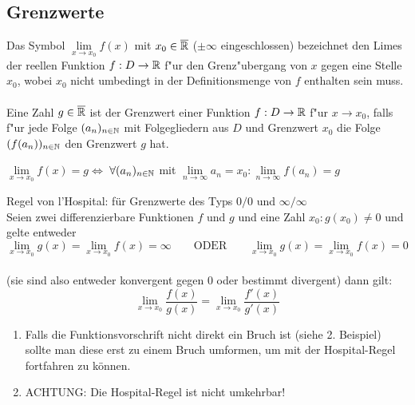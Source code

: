 \subsection{Grenzwerte}

\begin{Definition}
Das Symbol $\lim\limits_{x \rightarrow x_{0}}f(x)$ mit $x_{0} \in \overline{\mathbb{R}}$ ($\pm \infty$ eingeschlossen) bezeichnet den Limes der reellen Funktion $f:D\rightarrow \mathbb{R}$ f"ur den Grenz"ubergang von $x$ gegen eine Stelle $x_{0}$, wobei $x_{0}$ nicht umbedingt in der Definitionsmenge von $f$ enthalten sein muss.\\
\\
Eine Zahl $g \in \overline{\mathbb{R}}$ ist der Grenzwert einer Funktion $f:D\rightarrow \mathbb{R}$ f"ur $x\rightarrow x_{0}$, falls f"ur jede Folge $(a_{n})_{n\in \mathbb{N}}$ mit Folgegliedern aus $D$ und Grenzwert $x_{0}$ die Folge $(f(a_{n}))_{n\in \mathbb{N}}$ den Grenzwert $g$ hat.
\begin{center}
$\lim\limits_{x \rightarrow x_{0}}f(x) = g $\quad $\Leftrightarrow$ \quad $\forall (a_{n})_{n\in \mathbb{N}}$ mit $\lim\limits_{n \rightarrow \infty}a_{n}=x_{0} : \lim\limits_{n \rightarrow \infty}f(a_{n})=g$
\end{center}
\end{Definition}

\begin{Definition}
	Regel von l'Hospital: für Grenzwerte des Typs $0/0$ und $\infty/\infty$\\
	Seien zwei differenzierbare Funktionen $f$ und $g$ und eine Zahl $x_{0} : g(x_{0})\neq0$ und gelte entweder\\
	$$\lim\limits_{x \rightarrow x_{0}}g(x) = \lim\limits_{x \rightarrow x_{0}}f(x) = \infty \qquad \text{ODER} \qquad  \lim\limits_{x \rightarrow x_{0}}g(x) = \lim\limits_{x \rightarrow x_{0}}f(x) = 0$$\\
	(sie sind also entweder konvergent gegen $0$ oder bestimmt divergent) dann gilt:\\
	$$\lim\limits_{x \rightarrow x_{0}} \dfrac{f(x)}{g(x)} = \lim\limits_{x \rightarrow x_{0}}\dfrac{f'(x)}{g'(x)}$$
\end{Definition}

\begin{Bemerkung}
	\begin{enumerate}
		\item Falls die Funktionsvorschrift nicht direkt ein Bruch ist (siehe 2. Beispiel) sollte man diese erst zu einem Bruch umformen, um mit der Hospital-Regel fortfahren zu können.
		\item ACHTUNG: Die Hospital-Regel ist nicht umkehrbar!
	\end{enumerate}
\end{Bemerkung}

